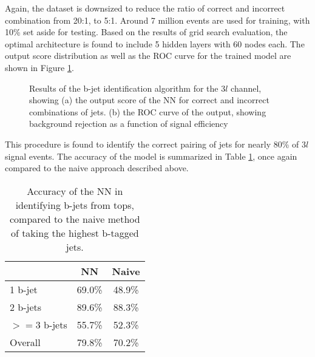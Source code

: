 Again, the dataset is downsized to reduce the ratio of correct and incorrect combination from 20:1, to 5:1. Around 7 million events are used for training, with 10\% set aside for testing. Based on the results of grid search evaluation, the optimal architecture is found to include 5 hidden layers with 60 nodes each. The output score distribution as well as the ROC curve for the trained model are shown in Figure \ref{fig:top3lresults}.

\begin{figure}[H]                                                                                                           
    \centering
   \label{fig:top3lresults}                                                                                               
   \caption{Results of the b-jet identification algorithm for the $3l$  channel, showing (a) the output score of the NN for correct and incorrect combinations of jets. (b) the ROC curve of the output, showing background rejection as a function of signal efficiency}
\end{figure}

This procedure is found to identify the correct pairing of jets for nearly 80\% of $3l$  signal events. The accuracy of the model is summarized in Table \ref{tab:topMatchAcc3l}, once again compared to the naive approach described above.

\begin{table}[H]
\centering
\caption{Accuracy of the NN in identifying b-jets from tops, compared to the naive method of taking the highest b-tagged jets.}
\begin{tabular}{|l|c|c|}
\hline\hline
& NN & Naive \\
\hline
1 b-jet    & 69.0\% & 48.9\% \\
2 b-jets   & 89.6\% & 88.3\% \\
$>=$3 b-jets & 55.7\% & 52.3\% \\
\hline
Overall & 79.8\% & 70.2\% \\
\hline\hline
\end{tabular}
\label{tab:topMatchAcc3l}
\end{table}


